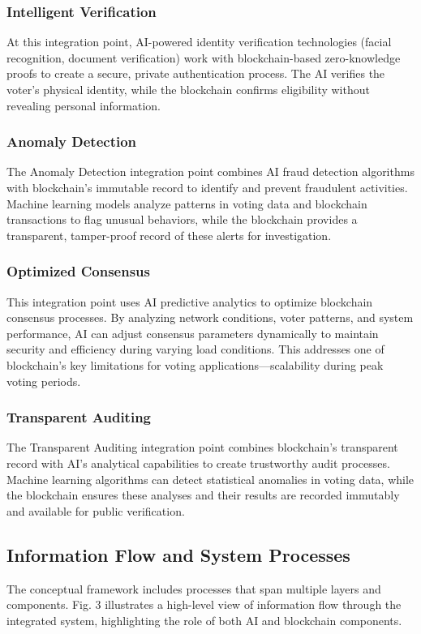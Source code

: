 \documentclass[conference]{IEEEtran}
\begin{document}
\subsubsection{Intelligent Verification}
At this integration point, AI-powered identity verification technologies (facial recognition, document verification) work with blockchain-based zero-knowledge proofs to create a secure, private authentication process. The AI verifies the voter's physical identity, while the blockchain confirms eligibility without revealing personal information.

\subsubsection{Anomaly Detection}
The Anomaly Detection integration point combines AI fraud detection algorithms with blockchain's immutable record to identify and prevent fraudulent activities. Machine learning models analyze patterns in voting data and blockchain transactions to flag unusual behaviors, while the blockchain provides a transparent, tamper-proof record of these alerts for investigation.

\subsubsection{Optimized Consensus}
This integration point uses AI predictive analytics to optimize blockchain consensus processes. By analyzing network conditions, voter patterns, and system performance, AI can adjust consensus parameters dynamically to maintain security and efficiency during varying load conditions. This addresses one of blockchain's key limitations for voting applications—scalability during peak voting periods.

\subsubsection{Transparent Auditing}
The Transparent Auditing integration point combines blockchain's transparent record with AI's analytical capabilities to create trustworthy audit processes. Machine learning algorithms can detect statistical anomalies in voting data, while the blockchain ensures these analyses and their results are recorded immutably and available for public verification.

\subsection{Information Flow and System Processes}
The conceptual framework includes processes that span multiple layers and components. Fig. 3 illustrates a high-level view of information flow through the integrated system, highlighting the role of both AI and blockchain components.
\end{document}
